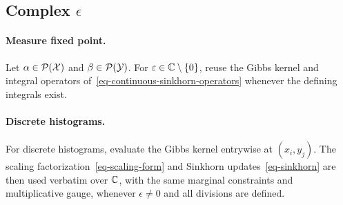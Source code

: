 \subsection{Complex \texorpdfstring{$\epsilon$}{epsilon}}
\label{sec-complex-epsilon}
\paragraph{Measure fixed point.}
Let $\alpha\in\mathcal{P}(\mathcal{X})$ and $\beta\in\mathcal{P}(\mathcal{Y})$. For $\varepsilon\in\mathbb{C}\setminus\{0\}$, reuse the Gibbs kernel and integral operators of~\eqref{eq-continuous-sinkhorn-operators} whenever the defining integrals exist.

\paragraph{Discrete histograms.}
For discrete histograms, evaluate the Gibbs kernel entrywise at $(x_i,y_j)$. The scaling factorization~\eqref{eq-scaling-form} and Sinkhorn updates~\eqref{eq-sinkhorn} are then used verbatim over $\mathbb{C}$, with the same marginal constraints and multiplicative gauge, whenever $\epsilon\neq0$ and all divisions are defined.

